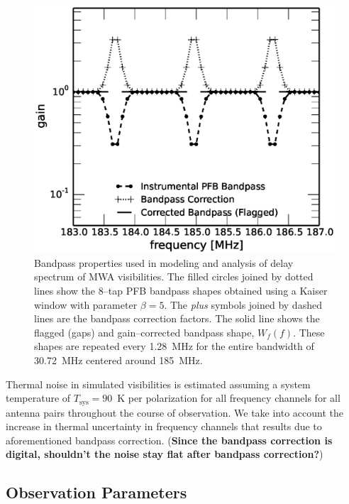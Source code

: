 \documentclass[preprint2,iop,numberedappendix]{emulateapj}
\begin{document}
\begin{figure}[htb]
\centering
\includegraphics[width=\linewidth]{figures/v1_0/bandpass_properties}
\caption{Bandpass properties used in modeling and analysis of delay spectrum of MWA visibilities. The filled circles joined by dotted lines show the 8--tap PFB bandpass shapes obtained using a Kaiser window with parameter $\beta=5$. The {\it plus} symbols joined by dashed lines are the bandpass correction factors. The solid line shows the flagged (gaps) and gain--corrected bandpass shape, $W_f(f)$. These shapes are repeated every 1.28~MHz for the entire bandwidth of 30.72~MHz centered around 185~MHz. \label{fig:bandpass}}
\end{figure}

Thermal noise in simulated visibilities is estimated assuming a system temperature of $T_\textrm{sys}=90$~K per polarization for all frequency channels for all antenna pairs throughout the course of observation. We take into account the increase in thermal uncertainty in frequency channels that results due to aforementioned bandpass correction. ({\bf Since the bandpass correction is digital, shouldn't the noise stay flat after bandpass correction?})

\subsection{Observation Parameters}\label{sec:obsparms}
\end{document}
